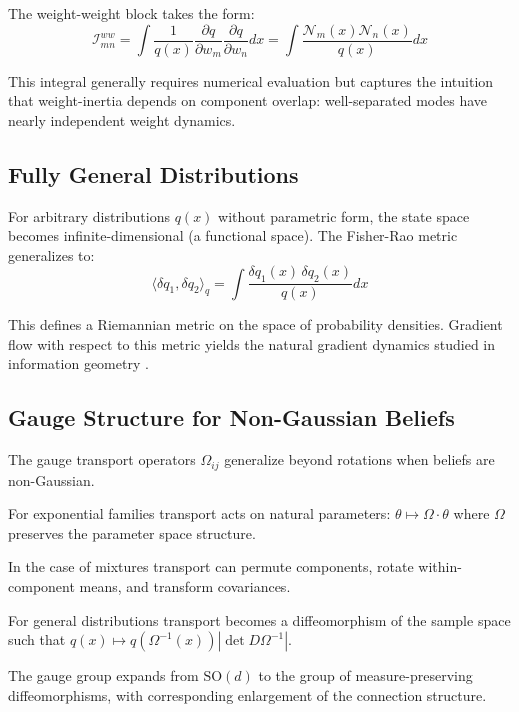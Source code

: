\documentclass[12pt]{article}
\begin{document}
The weight-weight block takes the form:
\begin{equation}
\mathcal{I}^{ww}_{mn} = \int \frac{1}{q(x)} \frac{\partial q}{\partial w_m} \frac{\partial q}{\partial w_n} dx = \int \frac{\mathcal{N}_m(x) \mathcal{N}_n(x)}{q(x)} dx
\end{equation}

This integral generally requires numerical evaluation but captures the intuition that weight-inertia depends on component overlap: well-separated modes have nearly independent weight dynamics.

\subsection{Fully General Distributions}

For arbitrary distributions $q(x)$ without parametric form, the state space becomes infinite-dimensional (a functional space). The Fisher-Rao metric generalizes to:
\begin{equation}
\langle \delta q_1, \delta q_2 \rangle_q = \int \frac{\delta q_1(x) \, \delta q_2(x)}{q(x)} dx
\end{equation}

This defines a Riemannian metric on the space of probability densities. Gradient flow with respect to this metric yields the natural gradient dynamics studied in information geometry \citep{Amari2016}.


\subsection{Gauge Structure for Non-Gaussian Beliefs}

The gauge transport operators $\Omega_{ij}$ generalize beyond rotations when beliefs are non-Gaussian.

For exponential families transport acts on natural parameters: $\theta \mapsto \Omega \cdot \theta$ where $\Omega$ preserves the parameter space structure.

In the case of mixtures transport can permute components, rotate within-component means, and transform covariances.

For general distributions transport becomes a diffeomorphism of the sample space such that $q(x) \mapsto q(\Omega^{-1}(x)) |\det D\Omega^{-1}|$.

The gauge group expands from $\mathrm{SO}(d)$ to the group of measure-preserving diffeomorphisms, with corresponding enlargement of the connection structure.
\end{document}
